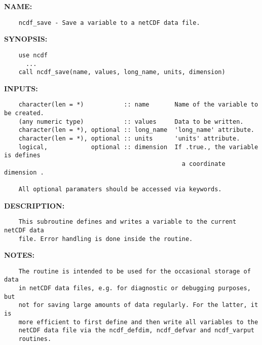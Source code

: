 \label{ch:robo119}
\label{ch:Variables_ncdf_save}
\textbf{NAME:}\hspace{0.08in}\begin{Verbatim}
    ncdf_save - Save a variable to a netCDF data file.
\end{Verbatim}
\textbf{SYNOPSIS:}\hspace{0.08in}\begin{Verbatim}
    use ncdf
      ...
    call ncdf_save(name, values, long_name, units, dimension)
\end{Verbatim}
\textbf{INPUTS:}\hspace{0.08in}\begin{Verbatim}
    character(len = *)           :: name       Name of the variable to be created.
    (any numeric type)           :: values     Data to be written.
    character(len = *), optional :: long_name  'long_name' attribute.
    character(len = *), optional :: units      'units' attribute.
    logical,            optional :: dimension  If .true., the variable is defines
                                                 a coordinate dimension .

    All optional paramaters should be accessed via keywords.
\end{Verbatim}
\textbf{DESCRIPTION:}\hspace{0.08in}\begin{Verbatim}
    This subroutine defines and writes a variable to the current netCDF data
    file. Error handling is done inside the routine.
\end{Verbatim}
\textbf{NOTES:}\hspace{0.08in}\begin{Verbatim}
    The routine is intended to be used for the occasional storage of data
    in netCDF data files, e.g. for diagnostic or debugging purposes, but
    not for saving large amounts of data regularly. For the latter, it is
    more efficient to first define and then write all variables to the
    netCDF data file via the ncdf_defdim, ncdf_defvar and ncdf_varput
    routines.
\end{Verbatim}
